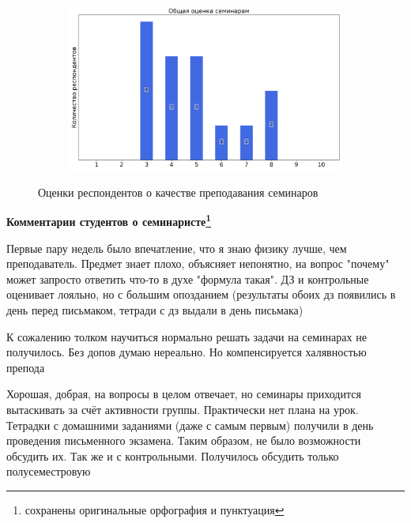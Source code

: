 \begin{figure}[H]
\begin{subfigure}[b]{0.45\textwidth}
			\end{subfigure}
			\begin{subfigure}[b]{0.45\textwidth}
				\centering
				\includegraphics[width=\textwidth]{images/1 course/Общая физика - механика/seminarists-marks-Удалова А.Г.-3.png}
			\end{subfigure}	
			\caption{Оценки респондентов о качестве преподавания семинаров}
		\end{figure}

		\textbf{Комментарии студентов о семинаристе\protect\footnote{сохранены оригинальные орфография и пунктуация}}
            \begin{commentbox} 
                Первые пару недель было впечатление, что я знаю физику лучше, чем преподаватель. Предмет знает плохо, объясняет непонятно, на вопрос "почему" может запросто ответить что-то в духе "формула такая". ДЗ и контрольные оценивает лояльно, но с большим опозданием (результаты обоих дз появились в день перед письмаком, тетради с дз выдали в день письмака) 
            \end{commentbox} 
        
            \begin{commentbox} 
                К сожалению толком научиться нормально решать задачи на семинарах не получилось. Без допов думаю нереально. Но компенсируется халявностью препода 
            \end{commentbox} 
        
            \begin{commentbox} 
                Хорошая, добрая, на вопросы в целом отвечает, но семинары приходится вытаскивать за счёт активности группы. Практически нет плана на урок. Тетрадки с домашними заданиями (даже с самым первым) получили в день проведения письменного экзамена. Таким образом, не было возможности обсудить их. Так же и с контрольными. Получилось обсудить только полусеместровую 
            \end{commentbox} 
        
